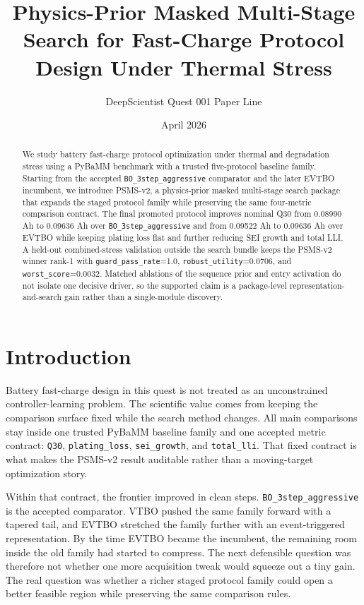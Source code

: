 \documentclass[11pt]{article}
\title{Physics-Prior Masked Multi-Stage Search for Fast-Charge Protocol Design Under Thermal Stress}
\author{DeepScientist Quest 001 Paper Line}
\date{April 2026}
\begin{document}
\maketitle

\begin{abstract}
We study battery fast-charge protocol optimization under thermal and degradation stress using a PyBaMM benchmark with a trusted five-protocol baseline family. Starting from the accepted \texttt{BO\_3step\_aggressive} comparator and the later EVTBO incumbent, we introduce PSMS-v2, a physics-prior masked multi-stage search package that expands the staged protocol family while preserving the same four-metric comparison contract. The final promoted protocol improves nominal Q30 from 0.08990 Ah to 0.09636 Ah over \texttt{BO\_3step\_aggressive} and from 0.09522 Ah to 0.09636 Ah over EVTBO while keeping plating loss flat and further reducing SEI growth and total LLI. A held-out combined-stress validation outside the search bundle keeps the PSMS-v2 winner rank-1 with \texttt{guard\_pass\_rate}=1.0, \texttt{robust\_utility}=0.0706, and \texttt{worst\_score}=0.0032. Matched ablations of the sequence prior and entry activation do not isolate one decisive driver, so the supported claim is a package-level representation-and-search gain rather than a single-module discovery.
\end{abstract}

\section{Introduction}

Battery fast-charge design in this quest is not treated as an unconstrained controller-learning problem. The scientific value comes from keeping the comparison surface fixed while the search method changes. All main comparisons stay inside one trusted PyBaMM baseline family and one accepted metric contract: \texttt{Q30}, \texttt{plating\_loss}, \texttt{sei\_growth}, and \texttt{total\_lli}. That fixed contract is what makes the PSMS-v2 result auditable rather than a moving-target optimization story.

Within that contract, the frontier improved in clean steps. \texttt{BO\_3step\_aggressive} is the accepted comparator. VTBO pushed the same family forward with a tapered tail, and EVTBO stretched the family further with an event-triggered representation. By the time EVTBO became the incumbent, the remaining room inside the old family had started to compress. The next defensible question was therefore not whether one more acquisition tweak would squeeze out a tiny gain. The real question was whether a richer staged protocol family could open a better feasible region while preserving the same comparison rules.
\end{document}
